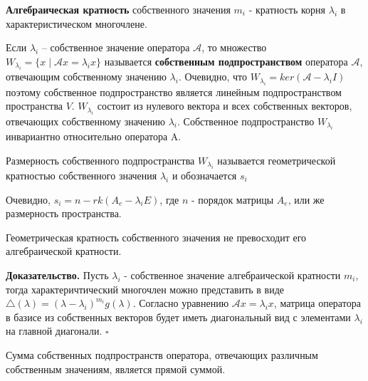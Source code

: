 \begin{defin}
\textbf{Алгебраическая кратность} собственного значения $m_i$ - кратность корня
$\lambda_i$ в характеристическом многочлене.
\end{defin}
Если $\lambda_i$ – собственное значение оператора $\mathcal A$, то множество 
$W_{\lambda_i}=\{x\mid\mathcal Ax=\lambda_ix\}$ называется \textbf{собственным
подпространством} оператора $\mathcal A$, отвечающим собственному значению 
$\lambda_i$.
Очевидно, что $W_{\lambda_i}=ker(\mathcal A-\lambda_iI)$ поэтому собственное
подпространство является линейным подпространством пространства $V$. 
$W_{\lambda_i}$ состоит из нулевого вектора и всех собственных векторов, 
отвечающих собственному значению $\lambda_i$.
Собственное подпространство $W_{\lambda_i}$
инвариантно относительно оператора A.
\begin{defin}
Размерность собственного подпространства $W_{\lambda_i}$
называется геометрической кратностью собственного значения $\lambda_i$ и
обозначается $s_i$
\end{defin}
Очевидно, $s_i=n-rk(A_e-\lambda_iE)$, где $n$ - порядок матрицы $A_e$, или же 
размерность пространства. 
\begin{theor}
Геометрическая кратность собственного значения не превосходит его 
алгебраической кратности.
\end{theor}
\textbf{Доказательство.} Пусть $\lambda_i$ - собственное значение 
алгебраической кратности $m_i$, тогда характеричтический многочлен можно
представить в виде $\triangle(\lambda)=(\lambda-\lambda_i)^{m_i}g(\lambda)$.
Согласно уравнению $\mathcal Ax=\lambda_ix$, матрица оператора в базисе из 
собственных векторов будет иметь диагональный вид с элементами $\lambda_i$ на 
главной диагонали. $\square$
\begin{theor}
Сумма собственных подпространств оператора, отвечающих различным собственным
значениям, является прямой суммой.
\end{theor}
